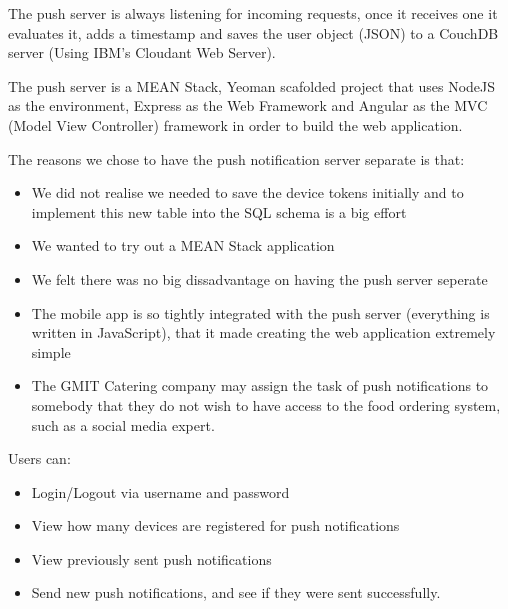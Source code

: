 The push server is always listening for incoming requests, once it receives one it evaluates it, adds a timestamp and saves the user object (JSON) to a CouchDB server (Using IBM's Cloudant Web Server).

The push server is a MEAN Stack, Yeoman scafolded project that uses NodeJS as the environment, Express as the Web Framework and Angular as the MVC (Model View Controller) framework in order to build the web application.
\linebreak

The reasons we chose to have the push notification server separate is that:
\begin{itemize}
\item We did not realise we needed to save the device tokens initially and to implement this new table into the SQL schema is a big effort
\item We wanted to try out a MEAN Stack application
\item We felt there was no big dissadvantage on having the push server seperate
\item The mobile app is so tightly integrated with the push server (everything is written in JavaScript), that it made creating the web application extremely simple
\item The GMIT Catering company may assign the task of push notifications to somebody that they do not wish to have access to the food ordering system, such as a social media expert. 
\end{itemize}

Users can:
\begin{itemize}
\item Login/Logout via username and password
\item View how many devices are registered for push notifications
\item View previously sent push notifications
\item Send new push notifications, and see if they were sent successfully.
\end{itemize}


